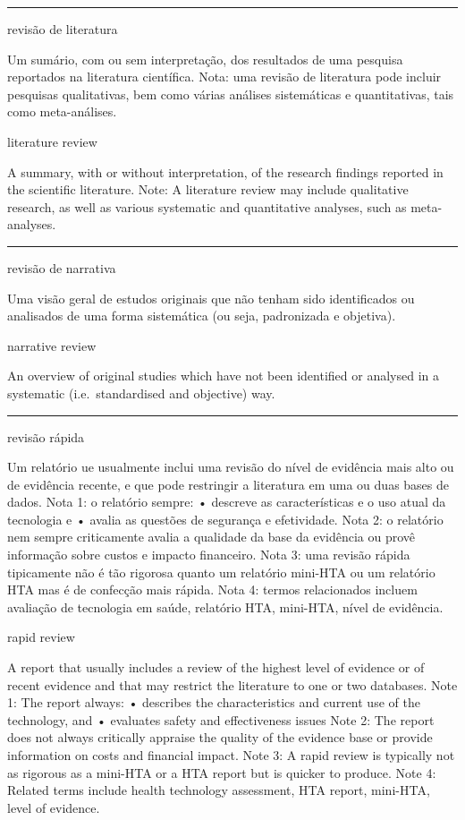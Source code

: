 \documentclass[
]{book}
\begin{document}
\begin{center}\rule{0.5\linewidth}{0.5pt}\end{center}

revisão de literatura

Um sumário, com ou sem interpretação, dos resultados de uma pesquisa reportados na literatura científica. Nota: uma revisão de literatura pode incluir pesquisas qualitativas, bem como várias análises sistemáticas e quantitativas, tais como meta-análises.

literature review

A summary, with or without interpretation, of the research findings reported in the scientific literature. Note: A literature review may include qualitative research, as well as various systematic and quantitative analyses, such as meta-analyses.

\begin{center}\rule{0.5\linewidth}{0.5pt}\end{center}

revisão de narrativa

Uma visão geral de estudos originais que não tenham sido identificados ou analisados de uma forma sistemática (ou seja, padronizada e objetiva).

narrative review

An overview of original studies which have not been identified or analysed in a systematic (i.e.~standardised and objective) way.

\begin{center}\rule{0.5\linewidth}{0.5pt}\end{center}

revisão rápida

Um relatório ue usualmente inclui uma revisão do nível de evidência mais alto ou de evidência recente, e que pode restringir a literatura em uma ou duas bases de dados. Nota 1: o relatório sempre: • descreve as características e o uso atual da tecnologia e • avalia as questões de segurança e efetividade. Nota 2: o relatório nem sempre criticamente avalia a qualidade da base da evidência ou provê informação sobre custos e impacto financeiro. Nota 3: uma revisão rápida tipicamente não é tão rigorosa quanto um relatório mini-HTA ou um relatório HTA mas é de confecção mais rápida. Nota 4: termos relacionados incluem avaliação de tecnologia em saúde, relatório HTA, mini-HTA, nível de evidência.

rapid review

A report that usually includes a review of the highest level of evidence or of recent evidence and that may restrict the literature to one or two databases. Note 1: The report always:
• describes the characteristics and current use of the technology, and
• evaluates safety and effectiveness issues Note 2: The report does not always critically appraise the quality of the evidence base or provide information on costs and financial impact. Note 3: A rapid review is typically not as rigorous as a mini-HTA or a HTA report but is quicker to produce. Note 4: Related terms include health technology assessment, HTA report, mini-HTA, level of evidence.
\end{document}
